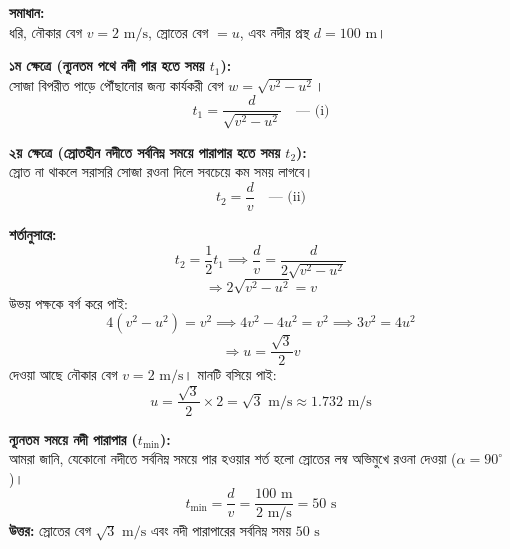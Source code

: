 \documentclass[12pt]{article}
\begin{document}
\textbf{সমাধান:} \\
ধরি, নৌকার বেগ $v = 2\text{ m/s}$, স্রোতের বেগ $= u$, এবং নদীর প্রস্থ $d = 100\text{ m}$।

\textbf{১ম ক্ষেত্রে (ন্যূনতম পথে নদী পার হতে সময় $t_1$):} \\
সোজা বিপরীত পাড়ে পৌঁছানোর জন্য কার্যকরী বেগ $w = \sqrt{v^2-u^2}$।
$$t_1 = \frac{d}{\sqrt{v^2-u^2}} \quad \text{--- (i)}$$

\textbf{২য় ক্ষেত্রে (স্রোতহীন নদীতে সর্বনিম্ন সময়ে পারাপার হতে সময় $t_2$):} \\
স্রোত না থাকলে সরাসরি সোজা রওনা দিলে সবচেয়ে কম সময় লাগবে।
$$t_2 = \frac{d}{v} \quad \text{--- (ii)}$$

\textbf{শর্তানুসারে:}
$$t_2 = \frac{1}{2}t_1 \implies \frac{d}{v} = \frac{d}{2\sqrt{v^2-u^2}}$$
$$\Rightarrow 2\sqrt{v^2-u^2} = v$$
উভয় পক্ষকে বর্গ করে পাই:
$$4(v^2-u^2) = v^2 \implies 4v^2 - 4u^2 = v^2 \implies 3v^2 = 4u^2$$
$$\Rightarrow u = \frac{\sqrt{3}}{2}v$$
দেওয়া আছে নৌকার বেগ $v = 2\text{ m/s}$। মানটি বসিয়ে পাই:
$$u = \frac{\sqrt{3}}{2} \times 2 = \sqrt{3}\text{ m/s} \approx 1.732\text{ m/s}$$

\textbf{ন্যূনতম সময়ে নদী পারাপার ($t_{\text{min}}$):} \\
আমরা জানি, যেকোনো নদীতে সর্বনিম্ন সময়ে পার হওয়ার শর্ত হলো স্রোতের লম্ব অভিমুখে রওনা দেওয়া ($\alpha = 90^\circ$)।
$$t_{\text{min}} = \frac{d}{v} = \frac{100\text{ m}}{2\text{ m/s}} = 50\text{ s}$$
\textbf{উত্তর:} স্রোতের বেগ $\sqrt{3}\text{ m/s}$ এবং নদী পারাপারের সর্বনিম্ন সময় $50\text{ s}$
\end{document}
